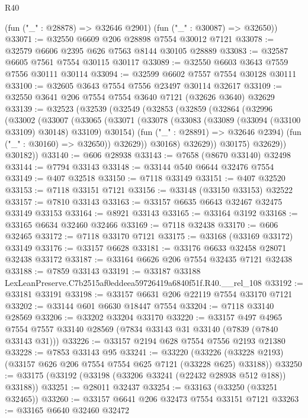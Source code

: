 \begin{lexlean}{R40}
\begin{coremodule}
      (fun ("_" : @28878) => @32646 @2901)
      (fun ("_" : @30087) => @32650))
@33071 := @32550 @6609 @206 @28898 @7554 @30012 @7121
@33078 := @32579 @6606 @2395 @626 @7563 @8144 @30105 @28889
@33083 := @32587 @6605 @7561 @7554 @30115 @30117
@33089 := @32550 @6603 @3643 @7559 @7556 @30111 @30114
@33094 := @32599 @6602 @7557 @7554 @30128 @30111
@33100 := @32605 @3643 @7554 @7556 @23497 @30114 @32617
@33109 := @32550 @3641 @206 @7554 @7554 @3640 @7121 (@32626 @3640) @32629
@33139 := @32523
    (@32539
      (@32549
        (@32853
          (@32859
            (@32864
              (@32996
                (@33002
                  (@33007
                    (@33065
                      (@33071
                        (@33078
                          (@33083 (@33089 (@33094 (@33100 @33109) @30148) @33109) @30154)
                          (fun ("_" : @28891) => @32646 @2394)
                          (fun ("_" : @30160) => @32650))
                        @32629))
                    @30168)
                  @32629))
              @30175)
            @32629))
        @30182))
@33140 := @606 @28938
@33143 := @7658 (@8670 @33140) @32498
@33144 := @7794 @33143
@33148 := @33144 @540 @6644 @32476 @7554
@33149 := @407 @32518
@33150 := @7118 @33149
@33151 := @407 @32520
@33153 := @7118 @33151 @7121
@33156 := @33148 (@33150 @33153) @32522
@33157 := @7810 @33143
@33163 := @33157 @6635 @6643 @32467 @32475 @33149 @33153
@33164 := @8921 @33143
@33165 := @33164 @3192
@33168 := @33165 @6634 @32460 @32466
@33169 := @7118 @32438
@33170 := @606 @32465
@33172 := @7118 @33170 @7121
@33175 := @33168 (@33169 @33172) @33149
@33176 := @33157 @6628
@33181 := @33176 @6633 @32458 @28071 @32438 @33172
@33187 := @33164 @6626 @206 @7554 @32435 @7121 @32438
@33188 := @7859 @33143
@33191 := @33187 @33188 LexLeanPreserve.C7b2515af0eddeea59726419a6840f51f.R40.__rel_108
@33192 := @33181 @33191
@33198 := @33157 @6631 @206 @22119 @7554 @33170 @7121
@33202 := @33144 @601 @6630 @18447 @7554
@33204 := @7118 @33140 @28569
@33206 := @33202 @33204 @33170
@33220 := @33157
    @497
    @4965
    @7554
    @7557
    @33140
    @28569
    (@7834 @33143 @31 @33140 (@7839 (@7840 @33143 @31)))
@33226 := @33157 @2194 @628 @7554 @7556 @2193 @21380
@33228 := @7853 @33143 @95
@33241 := @33220
    (@33226 (@33228 @2193) (@33157 @626 @206 @7554 @7554 @625 @7121 (@33228 @625) @33188))
@33250 := @33175 (@33192 (@33198 (@33206 @33241 (@22432 @28938 @512 @188)) @33188))
@33251 := @28011 @32437
@33254 := @33163 (@33250 (@33251 @32465))
@33260 := @33157 @6641 @206 @32473 @7554 @33151 @7121
@33263 := @33165 @6640 @32460 @32472

\end{coremodule}
\end{lexlean}
